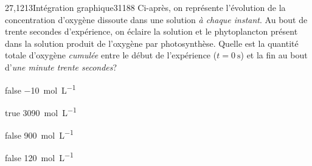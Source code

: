 \documentclass[11pt]{article}
\begin{document}
        \begin{question}{27,1213}{Intégration graphique}{3}{1188}
             Ci-après, on représente l'évolution de la concentration d'oxygène dissoute dans une solution \emph{à chaque instant}. Au bout de trente secondes d'expérience, on éclaire la solution et le phytoplancton présent dans la solution produit de l'oxygène par photosynthèse. Quelle est la quantité totale d'oxygène \emph{cumulée} entre le début de l'expérience ($t=\SI{0}{\second}$) et la fin au bout d'\emph{une minute trente secondes}?
            \begin{figure}
             \end{figure}
        \end{question}
        \begin{reponses}
            \item[false] \SI{-10}{\mol\per\liter}
		    \item[true] \SI{3090}{\mol\per\liter}
		    \item[false] \SI{900}{\mol\per\liter}
		    \item[false] \SI{120}{\mol\per\liter}
		\end{reponses}
		
\end{document}
